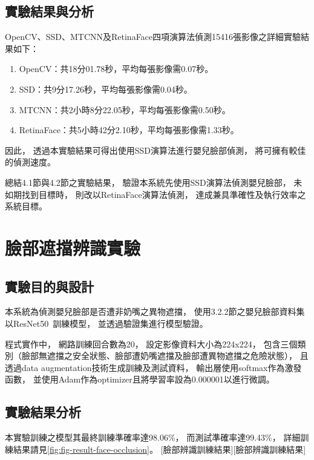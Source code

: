 \documentclass[class=NCU_thesis, crop=false]{standalone}
\begin{document}
\subsection{實驗結果與分析}
OpenCV、SSD、MTCNN及RetinaFace四項演算法偵測15416張影像之詳細實驗結果如下：
\begin{enumerate}
    \item OpenCV：共18分01.78秒，平均每張影像需0.07秒。
    \item SSD：共9分17.26秒，平均每張影像需0.04秒。
    \item MTCNN：共2小時8分22.05秒，平均每張影像需0.50秒。
    \item RetinaFace：共5小時42分2.10秒，平均每張影像需1.33秒。
\end{enumerate}

因此，
透過本實驗結果可得出使用SSD演算法進行嬰兒臉部偵測，
將可擁有較佳的偵測速度。

總結4.1節與4.2節之實驗結果，
驗證本系統先使用SSD演算法偵測嬰兒臉部，
未如期找到目標時，
則改以RetinaFace演算法偵測，
達成兼具準確性及執行效率之系統目標。

\section{臉部遮擋辨識實驗}
\subsection{實驗目的與設計}
本系統為偵測嬰兒臉部是否遭非奶嘴之異物遮擋，
使用3.2.2節之嬰兒臉部資料集以ResNet50~\cite{he_deep_2016}訓練模型，
並透過驗證集進行模型驗證。

程式實作中，
網路訓練回合數為20，
設定影像資料大小為224x224，
包含三個類別（臉部無遮擋之安全狀態、臉部遭奶嘴遮擋及臉部遭異物遮擋之危險狀態），
且透過data augmentation技術生成訓練及測試資料，
輸出層使用softmax作為激發函數，
並使用Adam作為optimizer且將學習率設為0.000001以進行微調。

\subsection{實驗結果分析}
本實驗訓練之模型其最終訓練準確率達98.06\%，
而測試準確率達99.43\%，
詳細訓練結果請見\cref{fig:fig-result-face-occlusion}。
[臉部辨識訓練結果][臉部辨識訓練結果]
\end{document}
